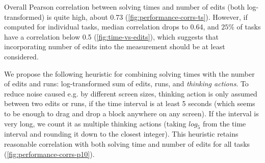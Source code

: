 Overall Pearson correlation between solving times and number of edits (both
log-transformed) is quite high, about 0.73 (\cref{fig:performance-corrs-ts}).
However, if computed for individual tasks,
median correlation drops to 0.64, %
and $25\%$ of tasks have a correlation below 0.5 %
(\cref{fig:time-vs-edits}), which suggests that incorporating number of edits into the
measurement should be at least considered.

We propose the following heuristic for combining solving times with the number of edits and runs: log-transformed sum of edits, runs, and \emph{thinking actions}.
To reduce noise caused e.g. by different screen sizes,
thinking action is only assumed between two edits
or runs, if the time interval is at least 5 seconds (which seems to be enough
to drag and drop a block anywhere on any screen). If the interval is very long,
we count it as multiple thinking actions (taking $log_5$ from the time interval
and rounding it down to the closest integer).
This heuristic retains reasonable correlation with both solving time
and number of edits for all tasks (\cref{fig:performance-corrs-p10}).



